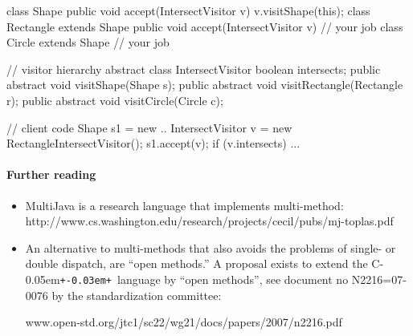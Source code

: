 \documentclass{article}
\newcommand{\Cpp}{C\kern-0.05em\texttt{+\kern-0.03em+}}
\begin{document}
\begin{enumerate}
\begin{java2}
class Shape {
    public void accept(IntersectVisitor v) {
	v.visitShape(this);
    }
}
class Rectangle extends Shape {
public  void accept(IntersectVisitor v) { 
        // your job
    }
}
class Circle extends Shape {
   // your job
}
 
// visitor hierarchy
abstract class IntersectVisitor { 
    boolean intersects; 
    public abstract void visitShape(Shape s);
    public abstract void visitRectangle(Rectangle r); 
    public abstract void visitCircle(Circle c); 
} 

// client code
  Shape s1 = new ..
  IntersectVisitor v = new RectangleIntersectVisitor();
  s1.accept(v);
  if (v.intersects) ...
\end{java2}
\end{enumerate}

\paragraph{Further reading}
\begin{itemize}
\item MultiJava is a research language that implements multi-method:\\
\textsf{http://www.cs.washington.edu/research/projects/cecil/pubs/mj-toplas.pdf}
\item An alternative to multi-methods that also avoids the problems of
single- or double dispatch, are ``open methods.'' A
 proposal exists to extend the \Cpp\ language by ``open methods'', see
document no N2216=07-0076 by the standardization committee:

\textsf{www.open-std.org/jtc1/sc22/wg21/docs/papers/2007/n2216.pdf}
\end{itemize}
\newpage
\end{document}
